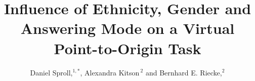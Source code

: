 \documentclass{frontiersSCNS} %
\def\firstAuthorLast{Sproll {et~al.}} %
\def\Authors{Daniel Sproll,$^{1,*}$, Alexandra Kitson\,$^{2}$ and Bernhard E. Riecke,$^2$}
\begin{document}
\onecolumn
{}

\title[Individual Factors in Path Integration]{Influence of Ethnicity, Gender and Answering Mode on a Virtual Point-to-Origin Task}
\author[\firstAuthorLast ]{\Authors}
\address{}
\correspondance{}
\extraAuth{}%
\topic{}%

\maketitle

\end{document}
